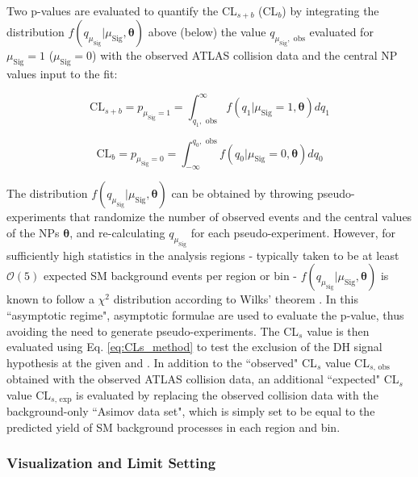 Two p-values are evaluated to quantify the CL\(_{s+b}\) (CL\(_b\)) by integrating the distribution \(f(q_{\mu_\text{Sig}}|\mu_\text{Sig}, \boldsymbol{\theta})\) above (below) the value \(q_{\mu_\text{Sig},\text{ obs}}\) evaluated for \(\mu_\text{Sig}=1\) (\(\mu_\text{Sig}=0\)) with the observed ATLAS collision data and the central NP values input to the fit:

\begin{equation}
\label{eq:pvalue_CLs_b}
\text{CL}_{s+b} = p_{\mu_\text{Sig}=1} = \int_{q_{1},\text{ obs}}^\infty f(q_{1}|\mu_\text{Sig}=1, \boldsymbol{\theta})dq_{1}
\end{equation}

\begin{equation}
\label{eq:pvalue_CLb}
\text{CL}_{b} = p_{\mu_\text{Sig}=0} = \int_{-\infty}^{q_0,\text{ obs}} f(q_{0}|\mu_\text{Sig}=0, \boldsymbol{\theta})dq_{0}
\end{equation}

The distribution \(f(q_{\mu_\text{Sig}}|\mu_\text{Sig}, \boldsymbol{\theta})\) can be obtained by throwing pseudo-experiments that randomize the number of observed events and the central values of the NPs \(\boldsymbol{\theta}\), and re-calculating \(q_{\mu_\text{Sig}}\) for each pseudo-experiment. However, for sufficiently high statistics in the analysis regions - typically taken to be at least \(\mathcal{O}(5)\) expected SM background events per region or bin - \(f(q_{\mu_\text{Sig}}|\mu_\text{Sig}, \boldsymbol{\theta})\) is known to follow a \(\chi^2\) distribution according to Wilks' theorem \cite{Wilks_1938}. In this ``asymptotic regime", asymptotic formulae \cite{Cowan_2011} are used to evaluate the p-value, thus avoiding the need to generate pseudo-experiments. The CL\(_s\) value is then evaluated using Eq. \ref{eq:CLs_method}  to test the exclusion of the DH signal hypothesis at the given \ms and \mZp. In addition to the ``observed" CL\(_s\) value CL\(_{s\text{, obs}}\) obtained with the observed ATLAS collision data, an additional ``expected" CL\(_s\) value CL\(_{s\text{, exp}}\) is evaluated by replacing the observed collision data with the background-only ``Asimov data set", which is simply set to be equal to the predicted yield of SM background processes in each region and bin.

\subsubsection{Visualization and Limit Setting}

